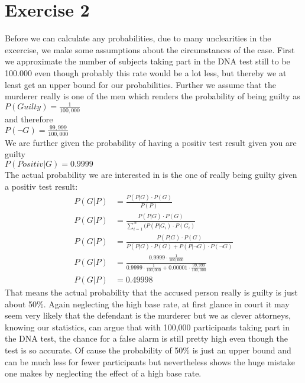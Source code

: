 \def \TutorialSheetNumber{3}


\section*{Exercise 2}
Before we can calculate any probabilities, due to many unclearities in the excercise, we make some assumptions about the circumstances of the case. First we approximate the number of subjects taking part in the DNA test still to be 100.000 even though probably this rate would be a lot less, but thereby we at least get an upper bound for our probabilities. Further we assume that the murderer really is one of the men which renders the probability of being guilty as \\ 
$P(Guilty) = \frac{1}{100,000}$\\
and therefore\\
$P(\neg G) = \frac{99,999}{100,000}$\\
We are further given the probability of having a positiv test result given you are guilty \\
$P(Positiv|G) = 0.9999 $ \\
The actual probability we are interested in is the one of really being guilty given a positiv test result:
\begin{align*}
  P(G | P) & = \frac{P(P|G) \cdot P(G)}{P(P)} \\
  P(G | P) & = \frac{P(P|G) \cdot P(G)}{\sum\limits_{i=1}^{N}(P(P|G_i)\cdot P(G_i)}\\
  P(G | P) & = \frac{P(P|G) \cdot P(G)}{P(P|G)\cdot P(G) + P(P|\neg G)\cdot P(\neg G)} \\
  P(G | P) & = \frac{0.9999 \cdot \frac{1}{100,000}}{0.9999 \cdot \frac{1}{100,000} + 0.00001 \cdot \frac{99,999}{100,000}}\\
  P(G | P) & = 0.49998
\end{align*}
 That means the actual probability that the accused person really is guilty is just about 50\%. Again neglecting the high base rate, at first glance in court  it may seem very likely that the defendant is the murderer but we as clever attorneys, knowing our statistics, can argue that with 100,000 participants taking part in the DNA test, the chance for a false alarm is still pretty high even though the test is so accurate. Of cause the probability of 50\% is just an upper bound and can be much less for fewer participants but nevertheless shows the huge mistake one makes by neglecting the effect of a high base rate.  
 

